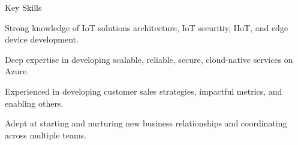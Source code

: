 \documentclass{resume} %
\begin{document}
\begin{rSection}{Key Skills}
\begin{rSubsectionNoTitle}
\item Strong knowledge of IoT solutions architecture, IoT securitiy, IIoT, and edge device development.
\item Deep expertise in developing scalable, reliable, secure, cloud-native services on Azure.
\item Experienced in developing customer sales strategies, impactful metrics, and enabling others.
\item Adept at starting and nurturing new business relationships and coordinating across multiple teams.
\end{rSubsectionNoTitle}
\end{rSection}
    
\end{document}
